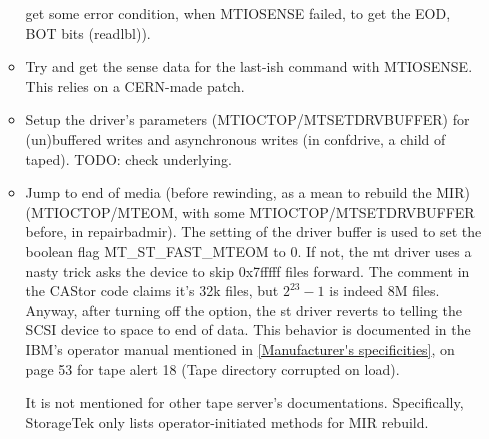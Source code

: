 \begin{itemize}
\begin{itemize}
          get some error condition, when MTIOSENSE failed, to get the EOD, BOT bits (readlbl)).
    \item Try and get the sense data for the last-ish command with MTIOSENSE. This
          relies on a CERN-made patch.
    \item Setup the driver's parameters (MTIOCTOP/MTSETDRVBUFFER) for (un)buffered 
          writes and asynchronous writes (in confdrive, a child of taped).
          TODO: check underlying.
    \item Jump to end of media (before rewinding, as a mean to rebuild the MIR) (MTIOCTOP/MTEOM, 
          with some MTIOCTOP/MTSETDRVBUFFER before, in repairbadmir). The setting of the driver
          buffer is used to set the boolean flag MT\_ST\_FAST\_MTEOM to 0. If not, the mt driver uses
          a nasty trick asks the device to skip 0x7fffff files forward. The comment in the CAStor code
          claims it's 32k files, but $2^{23}-1$ is indeed 8M files. Anyway, after turning off the 
          option, the st driver reverts to telling the SCSI device to space to end of data.
          This behavior is documented in the IBM's operator manual mentioned in \ref{Manufacturer's specificities},
          on page 53 for tape alert 18 (Tape directory corrupted on load).

          It is not mentioned for other tape server's documentations. Specifically, StorageTek
          only lists operator-initiated methods for MIR rebuild.


\end{itemize}
\end{itemize}
